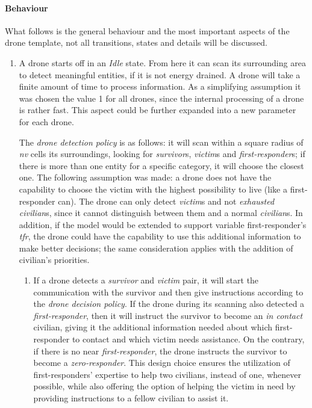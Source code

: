 \paragraph{Behaviour}
What follows is the general behaviour and the most important aspects of the drone template, not all transitions, states and details will be discussed.

\begin{enumerate}
	\item A drone starts off in an \textit{Idle} state. From here it can scan its surrounding area to detect meaningful entities, if it is not energy drained. A drone will take a finite amount of time to process information. As a simplifying assumption it was chosen the value 1 for all drones, since the internal processing of a drone is rather fast. This aspect could be further expanded into a new parameter for each drone.
 
    The \textit{drone detection policy} is as follows: it will scan within a square radius of \textit{nv} cells its surroundings, looking for \textit{survivor}s, \textit{victim}s and \textit{first-responder}s; if there is more than one entity for a specific category, it will choose the closest one. The following assumption was made: a drone does not have the capability to choose the victim with the highest possibility to live (like a first-responder can). The drone can only detect \textit{victim}s and not \textit{exhausted civilian}s, since it cannot distinguish between them and a normal \textit{civilian}s. In addition, if the model would be extended to support variable first-responder's \textit{tfr}, the drone could have the capability to use this additional information to make better decisions; the same consideration applies with the addition of civilian's priorities.
	\begin{enumerate}
		\item If a drone detects a \textit{survivor} and \textit{victim} pair, it will start the communication with the survivor and then give instructions according to the \textit{drone decision policy}. If the drone during its scanning also detected a \textit{first-responder}, then it will instruct the survivor to become an \textit{in contact} civilian, giving it the additional information needed about which first-responder to contact and which victim needs assistance. On the contrary, if there is no near \textit{first-responder}, the drone instructs the survivor to become a \textit{zero-responder}. This design choice ensures the utilization of first-responders' expertise to help two civilians, instead of one, whenever possible, while also offering the option of helping the victim in need by providing instructions to a fellow civilian to assist it.
		

\end{enumerate}
\end{enumerate}

